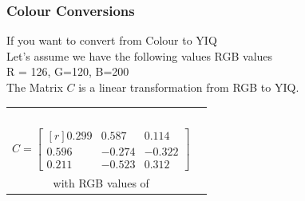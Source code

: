 \begin{frame}\frametitle{Colour Conversions}
If you want to convert from Colour to YIQ \\
    Let's assume we have the following values RGB values \\
    R = 126, G=120, B=200\\
    
    The Matrix $C$ is a linear transformation from RGB to YIQ.\\
    \vspace{0.5cm}
    
    \begin{tabular}{cc}
        \begin{minipage}{0.5\textwidth}
            \centering{Where $C$ is defined as follows}\\
            \ \ \
                $$ C = \begin{bmatrix*}[r]
                0.299       & 0.587  & 0.114 \\
                0.596       & -0.274  & -0.322  \\
                0.211        & -0.523   & 0.312  
            \end{bmatrix*} $$
        \end{minipage}
        &
        \begin{minipage}{0.5\textwidth}
            \centering{assuming a pixel $\vec{p}_{rgb}$\\ with RGB values of }
            $$ \vec{p}_{rgb} = \begin{bmatrix*}[r]
            126       \\
            120        \\
            200         
            \end{bmatrix*} $$
        \end{minipage}
    \end{tabular}\\
    
    
    \vspace{0.5cm}

    \end{frame}
